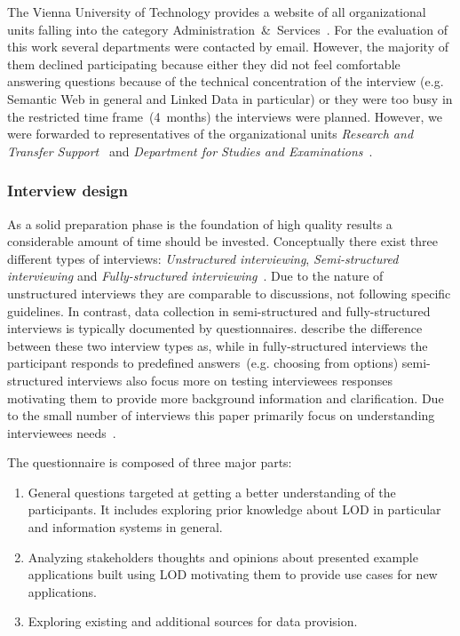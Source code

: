 \documentclass{article}
\begin{document}
The Vienna University of Technology provides a website of all organizational units falling into the category Administration~\&~Services~\cite{url:university-list-of-org-units}. For the evaluation of this work several departments were contacted by email. However, the majority of them declined participating because either they did not feel comfortable answering questions because of the technical concentration of the interview (e.g. Semantic Web in general and Linked Data in particular) or they were too busy in the restricted time frame~(4~months) the interviews were planned. However, we were forwarded to representatives of the organizational units \textit{Research and Transfer Support}~\cite{url:university-research-transfer} and \textit{Department for Studies and Examinations}~\cite{url:university-studies-and-examinations}. 
\subsubsection{Interview design}
As a solid preparation phase is the foundation of high quality results a considerable amount of time should be invested. Conceptually there exist three different types of interviews: \textit{Unstructured interviewing}, \textit{Semi-structured interviewing} and \textit{Fully-structured interviewing}~\cite{book:bernard-antropology-semi-structured-interview}. 
Due to the nature of unstructured interviews they are comparable to discussions, not following specific guidelines. In contrast, data collection in semi-structured and fully-structured interviews is typically documented by questionnaires. \citet{article:harris2010mixing} describe the difference between these two interview types as, while in fully-structured interviews the participant responds to predefined answers~(e.g. choosing from options) semi-structured interviews also focus more on testing interviewees responses motivating them to provide more background information and clarification. Due to the small number of interviews this paper primarily focus on understanding interviewees needs~\cite{book:miles2005handbook}.

The questionnaire is composed of three major parts:
\begin{enumerate}
	\item General questions targeted at getting a better understanding of the participants. It includes exploring prior knowledge about LOD in particular and information systems in general. 
	\item Analyzing stakeholders thoughts and opinions about presented example applications built using LOD motivating them to provide use cases for new applications. 
	\item Exploring existing and additional sources for data provision. 
\end{enumerate}
\end{document}
